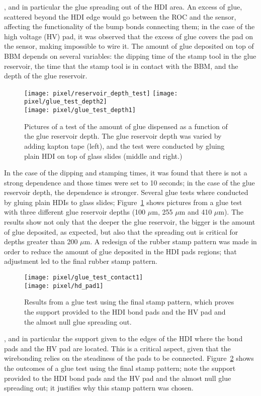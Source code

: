 \bit
\item {}, and in particular the glue spreading out of the HDI area. An excess of glue, scattered beyond the HDI edge would go between the ROC and the sensor, affecting the functionality of the bump bonds connecting them; in the case of the high voltage (HV) pad, it was observed that the excess of glue covers the pad on the sensor, making impossible to wire it. The amount of glue deposited on  top of BBM depends on several variables: the dipping time of the stamp tool in the glue reservoir, the time that the stamp tool is in contact with the BBM, and the depth of the glue reservoir.
\begin{figure}[!ht]
  \centering
  \texttt{[image: pixel/reservoir\_depth\_test]}
  \texttt{[image: pixel/glue\_test\_depth2]}\\
  \texttt{[image: pixel/glue\_test\_depth1]}
  \caption[Test of amount of glue deposited.]{Pictures of a test of the amount of glue dispensed as a function of the glue reservoir depth. The glue reservoir depth was varied by adding kapton tape (left), and the test were conducted by gluing plain HDI on top of glass slides (middle and right.)}\label{fig:glue_test_depth}
\end{figure}  
  In the case of the dipping and stamping times, it was found that there is not a strong dependence and those times were set to 10 seconds; in the case of the glue reservoir depth, the dependence is stronger. Several glue tests where conducted by gluing plain HDIs to glass slides; Figure~\ref{fig:glue_test_depth} shows pictures from a glue test with three different glue reservoir depths (100 $\mu$m, 255 $\mu$m and 410 $\mu$m). The results show not only that the deeper the glue reservoir, the bigger is the amount of glue deposited, as expected, but also that the spreading out is critical for depths greater than 200 $\mu$m. A redesign of the rubber stamp pattern was made in order to reduce the amount of glue deposited in the HDI pads regions; that adjustment led to the final rubber stamp pattern.

\begin{figure}[!ht]
  \centering  
  \texttt{[image: pixel/glue\_test\_contact1]}\\
  \texttt{[image: pixel/hd\_pad1]}
  \caption[Glue contact area test.]{Results from a glue test using the final stamp pattern, which proves the support provided to the HDI bond pads and the HV pad and the almost null glue spreading out.}\label{fig:glue_test}
\end{figure}
\item {}, and in particular the support given to the edges of the HDI where the bond pads and the HV pad are located. This is a critical aspect, given that the wirebonding relies on the steadiness of the pads to be connected. Figure~\ref{fig:glue_test} shows the outcomes of a glue test using the final stamp pattern; note the support provided to the HDI bond pads and the HV pad and the almost null glue spreading out; it justifies why this stamp pattern was chosen.   
\eit

